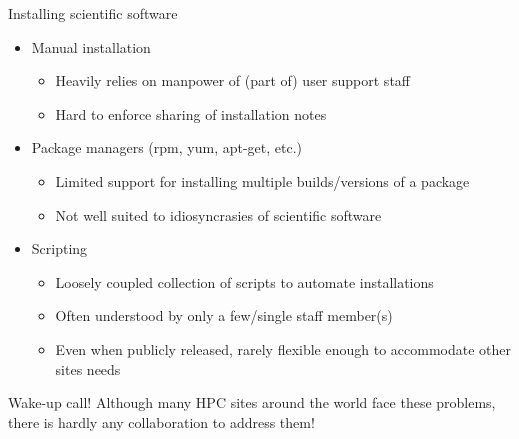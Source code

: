 \documentclass[10pt,xcolor={usenames,dvipsnames}]{beamer}
\begin{document}
\begin{frame}{Installing scientific software}
\begin{itemize}
    \item
        Manual installation
        \begin{itemize}
            \item
                Heavily relies on manpower of (part of) user support staff
            \item
                Hard to enforce sharing of installation notes
        \end{itemize}
    \item
        Package managers (rpm, yum, apt-get, etc.)
        \begin{itemize}
            \item
                Limited support for installing multiple builds/versions of a
                package
            \item
                Not well suited to idiosyncrasies of scientific software
        \end{itemize}
    \item
        Scripting
        \begin{itemize}
            \item
                Loosely coupled collection of scripts to automate installations
            \item
                Often understood by only a few/single staff member(s)
            \item
                Even when publicly released, rarely flexible enough to
                accommodate other sites needs
        \end{itemize}
\end{itemize}
\begin{center}
    \begin{minipage}{0.9\textwidth}
        \begin{alertblock}{\small Wake-up call!}
            \footnotesize
            Although many HPC sites around the world face these problems,
            there is hardly any collaboration to address them!
        \end{alertblock}
    \end{minipage}
\end{center}
\end{frame}

\end{document}
